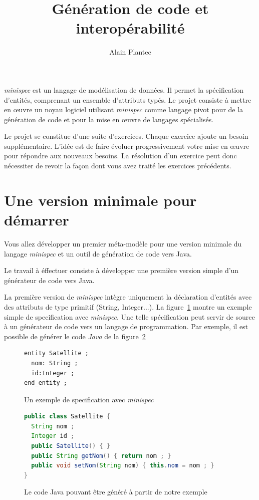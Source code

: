 \documentclass[12pt]{article}
\author{Alain Plantec}
\title{Génération de code et interopérabilité}
\begin{document}
\thispagestyle{empty}
\maketitle

\tableofcontents
\pagebreak
\textit{minispec} est un langage de modélisation de données. Il permet la spécification d'entités, comprenant un ensemble d'attributs typés. Le projet consiste à mettre en œuvre un noyau logiciel utilisant \textit{minispec} comme langage pivot pour de la génération de code et pour la mise en œuvre de langages spécialisés. 

Le projet se constitue d'une suite d'exercices. Chaque exercice ajoute un besoin supplémentaire. L'idée est de faire évoluer progressivement votre mise en œuvre pour répondre aux nouveaux besoins. La résolution  d'un exercice peut donc nécessiter de revoir la façon dont vous avez traité les exercices précédents. 

\section{Une version minimale pour démarrer}
Vous allez développer un premier méta-modèle pour une version minimale du langage \textit{minispec} et un outil de génération de code vers Java. 

Le travail à éffectuer consiste à développer une première version simple d'un générateur de code vers Java.

La première version de \textit{minispec} intègre uniquement la déclaration d'entités avec des attributs de type primitif (String, Integer...). La figure~\ref{fig:exemple-minispec1} montre un exemple simple de specification avec \textit{minispec}. Une telle spécification peut servir de source à un générateur de code vers un langage de programmation. Par exemple, il est possible de générer le code \textit{Java} de la figure~\ref{fig:code-java-genere1}

\begin{figure}
\begin{lstlisting}[language=express]
entity Satellite ;
  nom: String ;
  id:Integer ;
end_entity ;
\end{lstlisting}
\caption{Un exemple de specification avec \textit{minispec}}
\label{fig:exemple-minispec1}
\end{figure} 


\begin{figure}
\begin{lstlisting}[language=java]
public class Satellite {
  String nom ;
  Integer id ;
  public Satellite() { }
  public String getNom() { return nom ; }
  public void setNom(String nom) { this.nom = nom ; }
}
\end{lstlisting}
\caption{Le code Java pouvant être généré à partir de notre exemple}
\label{fig:code-java-genere1}
\end{figure} 
\end{document}
